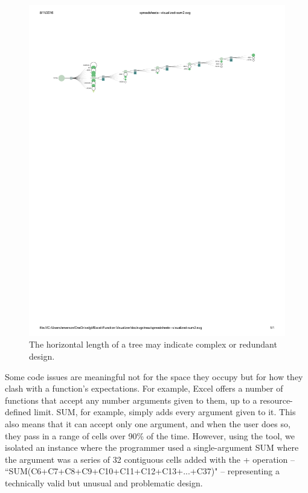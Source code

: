 \documentclass[conference]{IEEEtran}
\begin{document}
	\begin{figure}[h] \centering \includegraphics[width=\textwidth]{longsum}
		 \caption{The horizontal length of a tree may indicate
			complex or redundant design.} \label{fig:longsum} \end{figure}
	
	Some code issues are meaningful not for the space they occupy but for how they
	clash with a function's expectations. For example, Excel offers a number of
	functions that accept any number arguments given to them, up to a
	resource-defined limit. SUM, for example, simply adds every argument given to
	it. This also means that it can accept only one argument, and when the user
	does so, they pass in a range of cells over 90\% of the time. However, using
	the tool, we isolated an instance where the programmer used a single-argument
	SUM where the argument was a series of 32 contiguous cells added with the +
	operation -- ``SUM(C6+C7+C8+C9+C10+C11+C12+C13+...+C37)" -- representing a
	technically valid but unusual and problematic design.\par
	
\end{document}
